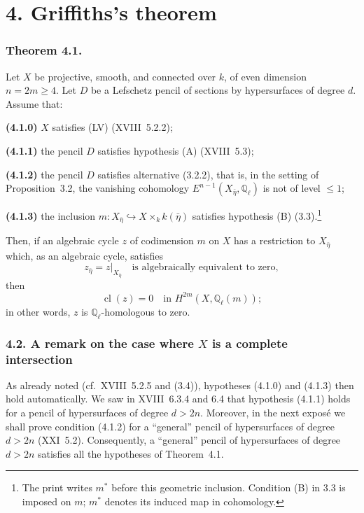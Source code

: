 \section*{4. Griffiths's theorem}

\subsubsection*{Theorem 4.1.}
Let $X$ be projective, smooth, and connected over $k$, of even dimension
$n=2m\geq4$.  Let $D$ be a Lefschetz pencil of sections by hypersurfaces
of degree $d$.  Assume that:

\medskip
\noindent\textbf{(4.1.0)} $X$ satisfies (LV) (XVIII~5.2.2);

\noindent\textbf{(4.1.1)} the pencil $D$ satisfies hypothesis (A)
(XVIII~5.3);

\noindent\textbf{(4.1.2)} the pencil $D$ satisfies alternative (3.2.2),
that is, in the setting of Proposition~3.2, the vanishing cohomology
$E^{n-1}(X_{\bar\eta},\mathbb Q_\ell)$ is not of level $\leq1$;

\noindent\textbf{(4.1.3)} the inclusion
$m:X_{\bar\eta}\hookrightarrow X\times_k k(\bar\eta)$ satisfies
hypothesis (B) (3.3).\footnote{The print writes $m^*$ before this geometric
inclusion.  Condition (B) in 3.3 is imposed on $m$; $m^*$ denotes its
induced map in cohomology.}

\medskip
Then, if an algebraic cycle $z$ of codimension $m$ on $X$ has a
restriction to $X_{\bar\eta}$ which, as an algebraic cycle, satisfies
\begin{equation}\tag{4.1.4}
z_{\bar\eta}=z|_{X_{\bar\eta}}
\quad\text{is algebraically equivalent to zero},
\end{equation}
then
\begin{equation}\tag{4.1.5}
\operatorname{cl}(z)=0
\quad\text{in }H^{2m}(X,\mathbb Q_\ell(m));
\end{equation}
in other words, $z$ is $\mathbb Q_\ell$-homologous to zero.

\subsubsection*{4.2. A remark on the case where $X$ is a complete intersection}
As already noted (cf.~XVIII~5.2.5 and (3.4)), hypotheses (4.1.0) and
(4.1.3) then hold automatically.  We saw in XVIII~6.3.4 and 6.4 that
hypothesis (4.1.1) holds for a pencil of hypersurfaces of degree $d>2n$.
Moreover, in the next exposé we shall prove condition (4.1.2) for a
``general'' pencil of hypersurfaces of degree $d>2n$ (XXI~5.2).
Consequently, a ``general'' pencil of hypersurfaces of degree $d>2n$
satisfies all the hypotheses of Theorem~4.1.

